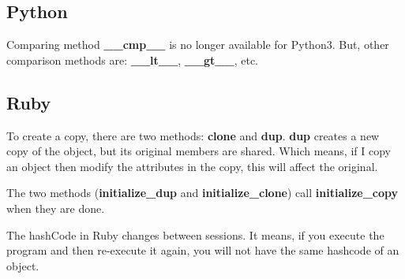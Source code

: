 \documentclass{KodeBook}
\begin{document}
\subsection{Python}



Comparing method \textbf{\_\_cmp\_\_} is no longer available for Python3. 
But, other comparison methods are: \textbf{\_\_lt\_\_}, \textbf{\_\_gt\_\_}, etc.

\subsection{Ruby}

To create a copy, there are two methods: \textbf{clone} and \textbf{dup}. 
\textbf{dup} creates a new copy of the object, but its original members are shared. 
Which means, if I copy an object then modify the attributes in the copy, this will affect the original.



The two methods (\textbf{initialize\_dup} and \textbf{initialize\_clone}) call \textbf{initialize\_copy} when they are done.


The hashCode in Ruby changes between sessions.
It means, if you execute the program and then re-execute it again, you will not have the same hashcode of an object.

\ifx\wholebook\relax\else
% 
% 
	
\end{document}
